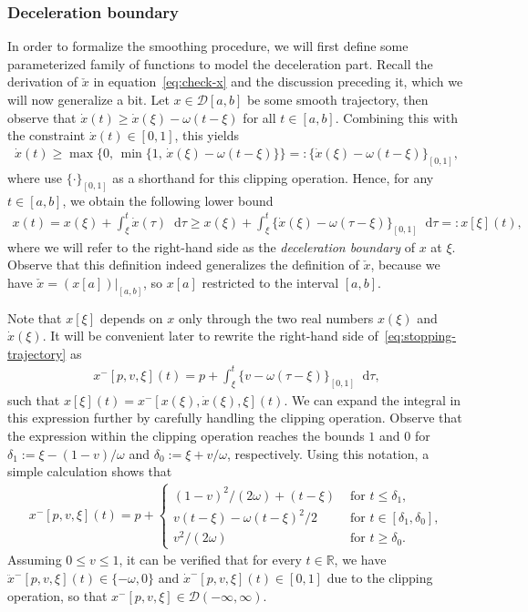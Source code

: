 \documentclass[a4paper]{article}
\theoremstyle{definition}
\theoremstyle{plain}
\newcommand*\diff{\mathop{}\!\mathrm{d}}
\begin{document}
\subsubsection{Deceleration boundary}
In order to formalize the smoothing procedure, we will first define some
parameterized family of functions to model the deceleration part.
%
Recall the derivation of $\check{x}$ in equation~\eqref{eq:check-x} and the discussion
preceding it, which we will now generalize a bit.
%
Let $x \in \mathcal{D}[a, b]$ be some smooth trajectory, then observe that $\dot{x}(t) \geq \dot{x}(\xi) - \omega(t - \xi)$ for all $t \in [a, b]$.
Combining this with the constraint $\dot{x}(t) \in [0, 1]$, this yields
\begin{align}
  \dot{x}(t) \geq \max\{ 0, \, \min\{1, \, \dot{x}(\xi) - \omega (t - \xi) \}\} =: \{\dot{x}(\xi) - \omega(t-\xi)\}_{[0,1]} ,
\end{align}
where use $\{ \cdot \}_{[0,1]}$ as a shorthand for this clipping operation.
%
Hence, for any $t \in [a,b]$, we obtain the following lower bound
\begin{align}\label{eq:stopping-trajectory}
  x(t) = x(\xi) + \int_{\xi}^{t} \dot{x}(\tau) \diff \tau \geq x(\xi) + \int_{\xi}^{t} \{\dot{x}(\xi) - \omega(\tau - \xi)\}_{[0,1]} \diff \tau =: x[\xi] (t) ,
\end{align}
where we will refer to the right-hand side as the \emph{deceleration boundary} of $x$
at $\xi$.
%
Observe that this definition indeed generalizes the definition of $\check{x}$,
because we have $\check{x}=(x[a])|_{[a,b]}$, so $x[a]$ restricted to the
interval $[a,b]$.

Note that $x[\xi]$ depends on $x$ only through the two real numbers $x(\xi)$ and
$\dot{x}(\xi)$. It will be convenient later to rewrite the right-hand side
of~\eqref{eq:stopping-trajectory} as
\begin{align}
  x^{-}[p, v, \xi](t) = p + \int_{\xi}^{t} \{ v - \omega(\tau - \xi) \}_{[0,1]} \diff \tau ,
\end{align}
such that $x[\xi](t) = x^{-}[x(\xi), \dot{x}(\xi), \xi](t)$.
%
We can expand the integral in this expression further by carefully handling
the clipping operation. Observe that the expression within the clipping
operation reaches the bounds $1$ and $0$ for $\delta_{1} := \xi - (1-v)/\omega$ and
$\delta_{0} := \xi + v/\omega$, respectively. Using this notation, a simple calculation
shows that
\begin{align}\label{eq:x-}
  x^{-}[p,v,\xi](t) = p +
  \begin{cases}
    {(1 - v)}^{2} / (2\omega) + (t - \xi) & \text{ for } t \leq \delta_{1} , \\
    v(t - \xi) - \omega{(t-\xi)}^{2} /2 & \text{ for } t \in [\delta_{1} , \delta_{0}] , \\
    v^{2}/(2\omega) & \text{ for } t \geq \delta_{0} .
  \end{cases}
\end{align}
Assuming $0 \leq v \leq 1$, it can be verified that for every $t \in \mathbb{R}$, we
have $\ddot{x}^{-}[p,v,\xi](t) \in \{-\omega, 0\}$ and
$\dot{x}^{-}[p,v,\xi](t) \in [0,1]$ due to the clipping operation, so that
$x^{-}[p,v,\xi] \in \mathcal{D}(-\infty,\infty)$.
\end{document}
